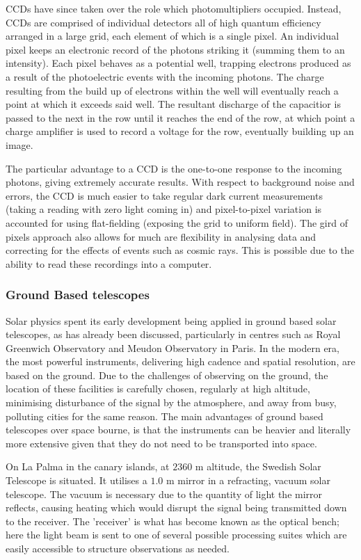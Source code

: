CCDs have since taken over the role which photomultipliers occupied.
Instead, CCDs are comprised of individual detectors all of high quantum efficiency arranged in a large grid, each element of which is a single pixel.
An individual pixel keeps an electronic record of the photons striking it (summing them to an intensity).
Each pixel behaves as a potential well, trapping electrons produced as a result of the photoelectric events with the incoming photons.
The charge resulting from the build up of electrons within the well will eventually reach a point at which it exceeds said well.
The resultant discharge of the capacitior is passed to the next in the row until it reaches the end of the row, at which point a charge amplifier is used to record a voltage for the row, eventually building up an image.

The particular advantage to a CCD is the one-to-one response to the incoming photons, giving extremely accurate results.
With respect to background noise and errors, the CCD is much easier to take regular dark current measurements (taking a reading with zero light coming in) and pixel-to-pixel variation is accounted for using flat-fielding (exposing the grid to uniform field).
The gird of pixels approach also allows for much are flexibility in analysing data and correcting for the effects of events such as cosmic rays.
This is possible due to the ability to read these recordings into a computer.

\subsubsection{Ground Based telescopes}

Solar physics spent its early development being applied in ground based solar telescopes, as has already been discussed, particularly in centres such as Royal Greenwich Observatory and Meudon Observatory in Paris.
In the modern era, the most powerful instruments, delivering high cadence and spatial resolution, are based on the ground.
Due to the challenges of observing on the ground, the location of these facilities is carefully chosen, regularly at high altitude, minimising disturbance of the signal by the atmosphere, and away from busy, polluting cities for the same reason.
The main advantages of ground based telescopes over space bourne, is that the instruments can be heavier and literally more extensive given that they do not need to be transported into space.

On La Palma in the canary islands, at $2360$ m altitude, the Swedish Solar Telescope is situated.
It utilises a $1.0$ m mirror in a refracting, vacuum solar telescope.
The vacuum is necessary due to the quantity of light the mirror reflects, causing heating which would disrupt the signal being transmitted down to the receiver.
The 'receiver' is what has become known as the optical bench; here the light beam is sent to one of several possible processing suites which are easily accessible to structure observations as needed.

